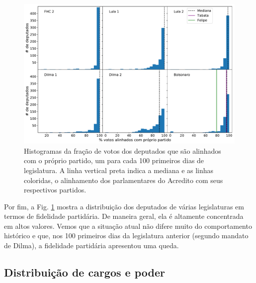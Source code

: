 \documentclass[12pt,a4paper]{article}
\begin{document}
\begin{figure}[H]
\centering
\includegraphics[width=1.0\textwidth]{graficos/fidelidade_partidaria_deputados_2019-05-03.pdf}
\caption{Histogramas da fração de votos dos deputados que são alinhados com o próprio partido, um para
  cada 100 primeiros dias de legislatura. A linha vertical preta indica a mediana e as linhas
  coloridas, o alinhamento dos parlamentares do Acredito com seus respectivos partidos.}
\label{fig:fid-poder-deputado}
\end{figure} 

Por fim, a Fig. \ref{fig:fid-poder-deputado} mostra a distribuição dos deputados de várias legislaturas
em termos de fidelidade partidária. De maneira geral, ela é altamente concentrada em altos valores. Vemos
que a situação atual não difere muito do comportamento histórico e que, nos 100 primeiros dias da legislatura
anterior (segundo mandato de Dilma), a fidelidade partidária apresentou uma queda. 


\subsection{Distribuição de cargos e poder}
\end{document}

